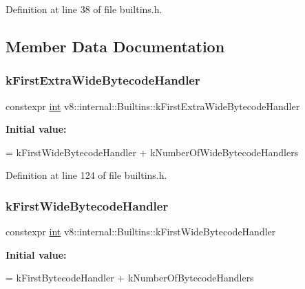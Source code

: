 Definition at line 38 of file builtins.\+h.



\subsection{Member Data Documentation}
\mbox{\label{classv8_1_1internal_1_1Builtins_ac62fd54b05b1d10c0c918f3be5dd6d90}} 
\subsubsection{\texorpdfstring{k\+First\+Extra\+Wide\+Bytecode\+Handler}{kFirstExtraWideBytecodeHandler}}
{\footnotesize\ttfamily constexpr \mbox{\hyperlink{classint}{int}} v8\+::internal\+::\+Builtins\+::k\+First\+Extra\+Wide\+Bytecode\+Handler\hspace{0.3cm}{\ttfamily [static]}}

{\bfseries Initial value\+:}
\begin{DoxyCode}
=
      kFirstWideBytecodeHandler + kNumberOfWideBytecodeHandlers
\end{DoxyCode}


Definition at line 124 of file builtins.\+h.

\mbox{\label{classv8_1_1internal_1_1Builtins_a6751c9a4b56c6f3f1e4ae3eb6b474bc1}} 
\subsubsection{\texorpdfstring{k\+First\+Wide\+Bytecode\+Handler}{kFirstWideBytecodeHandler}}
{\footnotesize\ttfamily constexpr \mbox{\hyperlink{classint}{int}} v8\+::internal\+::\+Builtins\+::k\+First\+Wide\+Bytecode\+Handler\hspace{0.3cm}{\ttfamily [static]}}

{\bfseries Initial value\+:}
\begin{DoxyCode}
=
      kFirstBytecodeHandler + kNumberOfBytecodeHandlers
\end{DoxyCode}


